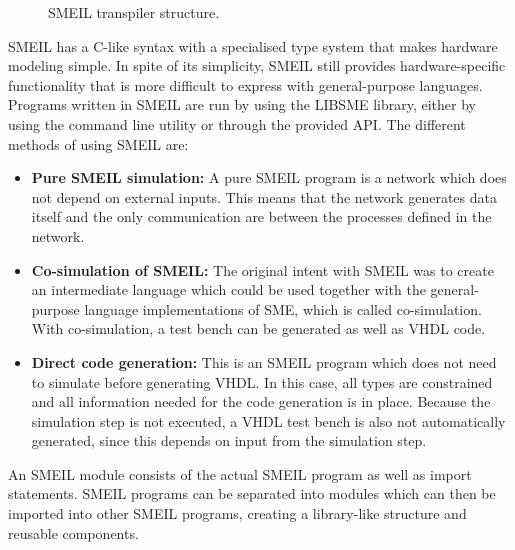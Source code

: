 \begin{figure}[!ht]
  \centering
  \caption{SMEIL transpiler structure.}
  \label{fig:smeil_transpiler}
\end{figure}
SMEIL has a C-like syntax with a specialised type system that makes hardware modeling simple. In spite of its simplicity, SMEIL still provides hardware-specific functionality that is more difficult to express with general-purpose languages.\\

Programs written in SMEIL are run by using the LIBSME library, either by using the command line utility or through the provided API.
The different methods of using SMEIL are:\\
\begin{itemize}
    \item \textbf{Pure SMEIL simulation:} A pure SMEIL program is a network which does not depend on external inputs. This means that the network generates data itself and the only communication are between the processes defined in the network.
    \item \textbf{Co-simulation of SMEIL:} The original intent with SMEIL was to create an intermediate language which could be used together with the general-purpose language implementations of SME, which is called co-simulation. With co-simulation, a test bench can be generated as well as VHDL code.
    \item \textbf{Direct code generation:} This is an SMEIL program which does not need to simulate before generating VHDL. In this case, all types are constrained and all information needed for the code generation is in place. Because the simulation step is not executed, a VHDL test bench is also not automatically generated, since this depends on input from the simulation step.
\end{itemize}
An SMEIL module consists of the actual SMEIL program as well as import statements. SMEIL programs can be separated into modules which can then be imported into other SMEIL programs, creating a library-like structure and reusable components.\\

